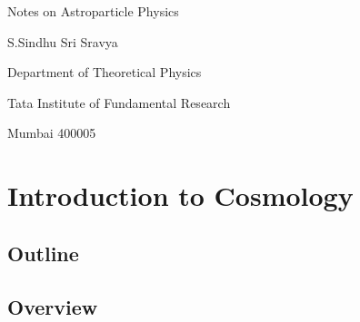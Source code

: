 \documentclass[12pt,a4paper,oneside]{book}
\begin{document}

\baselineskip 20pt




\thispagestyle{empty}
\topskip 45pt

\vskip 30pt
\centerline{ \Huge Notes on Astroparticle Physics} 
\vskip 25pt
\centerline{\Large  S.Sindhu Sri Sravya}
\vskip 8pt
\vskip 30pt 
\vskip 8pt 
\centerline{\Large  Department of Theoretical Physics}
\vskip 8pt 
\centerline{\Large  Tata Institute of Fundamental Research}
\vskip 8pt 
\centerline{\Large  Mumbai 400005}
\vskip 8pt




\newpage
\thispagestyle{empty}
\tableofcontents
\newpage




\chapter{Introduction to Cosmology}
\section{ Outline}

\section{Overview}
\end{document}
